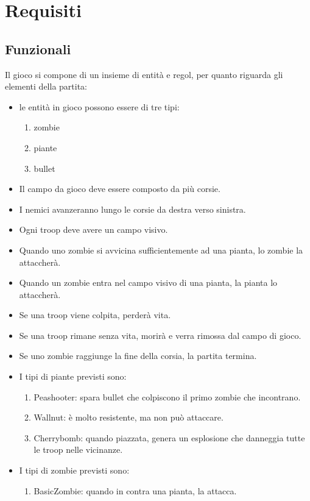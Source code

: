 \section{Requisiti}

\subsection{Funzionali}
Il gioco si compone di un insieme di entità e regol, per quanto riguarda gli elementi della partita:
\begin{itemize}
    \item le entità in gioco possono essere di tre tipi:
    \begin{enumerate}
        \item zombie
        \item piante
        \item bullet
    \end{enumerate}
    \item Il campo da gioco deve essere composto da più corsie.
    \item I nemici avanzeranno lungo le corsie da destra verso sinistra.
    \item Ogni troop deve avere un campo visivo.
    \item Quando uno zombie si avvicina sufficientemente ad una pianta, lo zombie la attaccherà.
    \item Quando un zombie entra nel campo visivo di una pianta, la pianta lo attaccherà.
    \item Se una troop viene colpita, perderà vita.
    \item Se una troop rimane senza vita, morirà e verra rimossa dal campo di gioco.
    \item Se uno zombie raggiunge la fine della corsia, la partita termina.
    \item I tipi di piante previsti sono:
    \begin{enumerate}
        \item Peashooter: spara bullet che colpiscono il primo zombie che incontrano.
        \item Wallnut: è molto resistente, ma non può attaccare.
        \item Cherrybomb: quando piazzata, genera un esplosione che danneggia tutte le troop nelle vicinanze.
    \end{enumerate}
    \item I tipi di zombie previsti sono:
    \begin{enumerate}
        \item BasicZombie: quando in contra una pianta, la attacca.

\end{enumerate}
\end{itemize}
